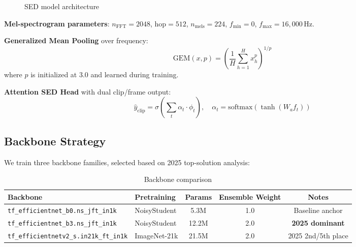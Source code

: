 \documentclass[11pt,a4paper]{article}
\begin{document}
\begin{figure}[H]
\centering
{}
\caption{SED model architecture}
\end{figure}

\noindent\textbf{Mel-spectrogram parameters}: $n_{\text{FFT}}=2048$, $\text{hop}=512$,
$n_{\text{mels}}=224$, $f_{\min}=0$, $f_{\max}=16{,}000$\,Hz.

\noindent\textbf{Generalized Mean Pooling} over frequency:
\[
\text{GEM}(x, p) = \left(\frac{1}{H}\sum_{h=1}^{H} x_{h}^p\right)^{1/p}
\]
where $p$ is initialized at 3.0 and learned during training.

\noindent\textbf{Attention SED Head} with dual clip/frame output:
\[
\hat{y}_{\text{clip}} = \sigma\!\left(\sum_t \alpha_t \cdot \phi_t\right), \quad
\alpha_t = \text{softmax}\!\left(\tanh\!\left(W_a f_t\right)\right)
\]

\subsection{Backbone Strategy}

We train three backbone families, selected based on 2025 top-solution analysis:

\begin{table}[H]
\centering
\caption{Backbone comparison}
\begin{tabular}{llccc}
\toprule
\textbf{Backbone} & \textbf{Pretraining} & \textbf{Params} & \textbf{Ensemble Weight} & \textbf{Notes} \\
\midrule
\texttt{tf\_efficientnet\_b0.ns\_jft\_in1k} & NoisyStudent & 5.3M & 1.0 & Baseline anchor \\
\texttt{tf\_efficientnet\_b3.ns\_jft\_in1k} & NoisyStudent & 12.2M & 2.0 & \textbf{2025 dominant} \\
\texttt{tf\_efficientnetv2\_s.in21k\_ft\_in1k} & ImageNet-21k & 21.5M & 2.0 & 2025 2nd/5th place \\
\bottomrule
\end{tabular}
\end{table}
\end{document}
